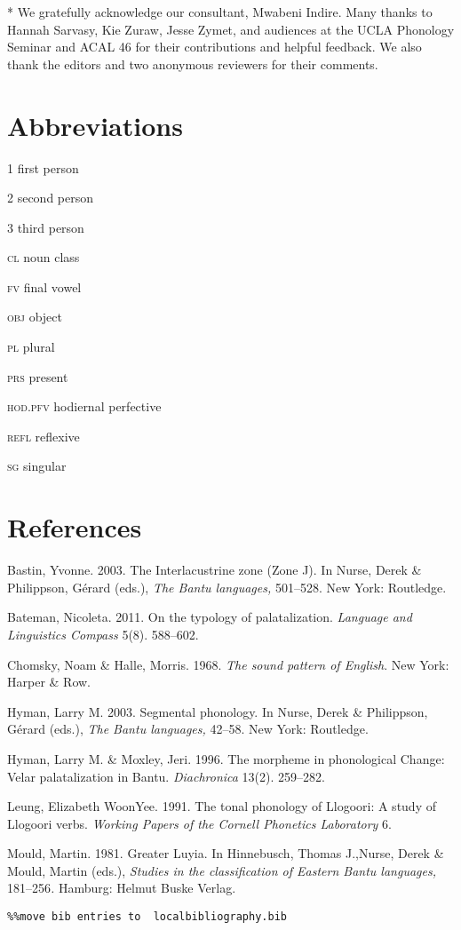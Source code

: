 * We gratefully acknowledge our consultant, Mwabeni Indire. Many thanks to Hannah Sarvasy, Kie Zuraw, Jesse Zymet, and audiences at the UCLA Phonology Seminar and ACAL 46 for their contributions and helpful feedback. We also thank the editors and two anonymous reviewers for their comments.

\chapter{Abbreviations}

\textsc{1    }first person

\textsc{2    }second person

\textsc{3    }third person

\textsc{cl}    noun class

\textsc{fv    }final vowel

\textsc{obj}    object

\textsc{pl}    plural

\textsc{prs}    present

\textsc{hod.pfv}  hodiernal perfective

\textsc{refl}    reflexive

\textsc{sg    }singular

\chapter{}
\chapter{References}

Bastin, Yvonne. 2003. The Interlacustrine zone (Zone J). In Nurse, Derek \& Philippson, Gérard (eds.), \textit{The Bantu languages,} 501–528. New York: Routledge. 

Bateman, Nicoleta. 2011. On the typology of palatalization. \textit{Language and Linguistics Compass} 5(8). 588–602.

Chomsky, Noam \& Halle, Morris. 1968. \textit{The sound pattern of English}. New York: Harper \& Row. 

Hyman, Larry M. 2003. Segmental phonology. In Nurse, Derek \& Philippson, Gérard (eds.), \textit{The Bantu languages,} 42–58. New York: Routledge.

Hyman, Larry M. \& Moxley, Jeri. 1996. The morpheme in phonological Change: Velar palatalization in Bantu. \textit{Diachronica }13(2). 259–282. 

Leung, Elizabeth WoonYee. 1991. The tonal phonology of Llogoori: A study of Llogoori verbs. \textit{Working Papers of the Cornell Phonetics Laboratory }6. 

Mould, Martin. 1981. Greater Luyia. In Hinnebusch, Thomas J.,Nurse, Derek \& Mould, Martin (eds.), \textit{Studies in the classification of Eastern Bantu languages, }181–256\textit{. }Hamburg: Helmut Buske Verlag. 


\begin{verbatim}%%move bib entries to  localbibliography.bib
\end{verbatim}
